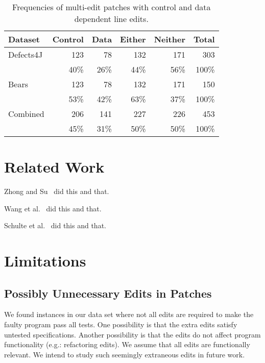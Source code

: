\documentclass[sigconf, timestamp-false, anonymous=true]{acmart}
\begin{document}
\begin{table}
{\begin{center}
	\begin{tabular}{l | rrrr | r}
		\toprule
		Dataset & Control & Data & Either & Neither & Total \\
		\midrule
		Defects4J & 123 & 78 & 132 & 171 & 303 \\
		& 40\% & 26\% & 44\% & 56\% & 100\% \\
		Bears & 123 & 78 & 132 & 171 & 150 \\
		& 53\% & 42\% & 63\% & 37\% & 100\% \\
		\midrule
		Combined & 206 & 141 & 227 & 226 & 453 \\
		& 45\% & 31\% & 50\% & 50\% & 100\% \\
		\bottomrule
	\end{tabular}
 \end{center}
}
	\caption{Frequencies of multi-edit patches with control and data dependent line edits.}
	\label{tab:multi-edit-dependency-frequencies}
\end{table}

\section{Related Work}
Zhong and Su~\cite{zhong2015} did this and that.

Wang et al.~\cite{wang2018} did this and that.

Schulte et al.~\cite{schulte} did this and that.

\section{Limitations}

\subsection{Possibly Unnecessary Edits in Patches}

We found instances in our data set where not all edits are required to 
make the faulty program pass all tests. One possibility is that the extra 
edits satisfy untested specifications. Another possibility is that the edits 
do not affect program functionality (e.g.: refactoring edits). We assume 
that all edits are functionally relevant. We intend to study such seemingly
extraneous edits in future work.



\end{document}
